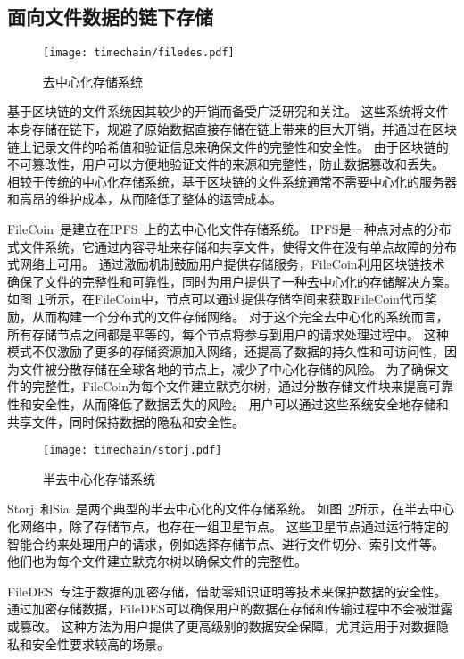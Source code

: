 \subsection{面向文件数据的链下存储}
\begin{figure}[t]
    \centering
    \texttt{[image: timechain/filedes.pdf]}
    \caption{去中心化存储系统}
    \label{fig:filedes}
\end{figure}

基于区块链的文件系统因其较少的开销而备受广泛研究和关注。
这些系统将文件本身存储在链下，规避了原始数据直接存储在链上带来的巨大开销，并通过在区块链上记录文件的哈希值和验证信息来确保文件的完整性和安全性。
由于区块链的不可篡改性，用户可以方便地验证文件的来源和完整性，防止数据篡改和丢失。
相较于传统的中心化存储系统，基于区块链的文件系统通常不需要中心化的服务器和高昂的维护成本，从而降低了整体的运营成本。

FileCoin~\cite{bauer2022filecoin}是建立在IPFS~\cite{benet2014ipfs}上的去中心化文件存储系统。
IPFS是一种点对点的分布式文件系统，它通过内容寻址来存储和共享文件，使得文件在没有单点故障的分布式网络上可用。
通过激励机制鼓励用户提供存储服务，FileCoin利用区块链技术确保了文件的完整性和可靠性，同时为用户提供了一种去中心化的存储解决方案。
如图~\ref{fig:filedes}所示，在FileCoin中，节点可以通过提供存储空间来获取FileCoin代币奖励，从而构建一个分布式的文件存储网络。
对于这个完全去中心化的系统而言，所有存储节点之间都是平等的，每个节点将参与到用户的请求处理过程中。
这种模式不仅激励了更多的存储资源加入网络，还提高了数据的持久性和可访问性，因为文件被分散存储在全球各地的节点上，减少了中心化存储的风险。
为了确保文件的完整性，FileCoin为每个文件建立默克尔树，通过分散存储文件块来提高可靠性和安全性，从而降低了数据丢失的风险。
用户可以通过这些系统安全地存储和共享文件，同时保持数据的隐私和安全性。

\begin{figure}[t]
    \centering
    \texttt{[image: timechain/storj.pdf]}
    \caption{半去中心化存储系统}
    \label{fig:storj}
\end{figure}

Storj~\cite{storj2018storj}和Sia~\cite{vorick2014sia}是两个典型的半去中心化的文件存储系统。
如图~\ref{fig:storj}所示，在半去中心化网络中，除了存储节点，也存在一组卫星节点。
这些卫星节点通过运行特定的智能合约来处理用户的请求，例如选择存储节点、进行文件切分、索引文件等。
他们也为每个文件建立默克尔树以确保文件的完整性。

FileDES~\cite{xu2024filedes}专注于数据的加密存储，借助零知识证明等技术来保护数据的安全性。
通过加密存储数据，FileDES可以确保用户的数据在存储和传输过程中不会被泄露或篡改。
这种方法为用户提供了更高级别的数据安全保障，尤其适用于对数据隐私和安全性要求较高的场景。

